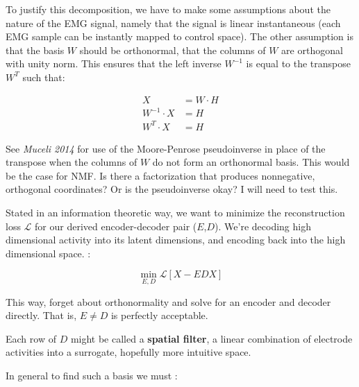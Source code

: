 \documentclass[
  a4paper,
]{article}
\begin{document}
To justify this decomposition, we have to make some assumptions about
the nature of the EMG signal, namely that the signal is linear
instantaneous (each EMG sample can be instantly mapped to control
space). The other assumption is that the basis \(W\) should be
orthonormal, that the columns of \(W\) are orthogonal with unity norm.
This ensures that the left inverse \(W^{-1}\) is equal to the transpose
\(W^T\) such that:

\begin{align*}
X &= W\cdot{H} \\
W^{-1}\cdot{X} &= {H} \\
W^{T}\cdot{X} &= {H}
\end{align*}

See \emph{Muceli 2014} for use of the Moore-Penrose pseudoinverse in
place of the transpose when the columns of \(W\) do not form an
orthonormal basis. This would be the case for NMF. Is there a
factorization that produces nonnegative, orthogonal coordinates? Or is
the pseudoinverse okay? I will need to test this.

Stated in an information theoretic way, we want to minimize the
reconstruction loss \(\mathcal{L}\) for our derived encoder-decoder pair
(\(E\),\(D\)). We're decoding high dimensional activity into its latent
dimensions, and encoding back into the high dimensional space. :

\[
\min_{E,D}{\mathcal{L}\left[X - EDX\right]}
\]

This way, forget about orthonormality and solve for an encoder and
decoder directly. That is, \(E\neq{D}\) is perfectly acceptable.

Each row of \(D\) might be called a \textbf{spatial filter}, a linear
combination of electrode activities into a surrogate, hopefully more
intuitive space.

In general to find such a basis we must :
\end{document}
